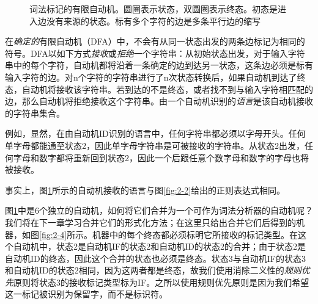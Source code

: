 \documentclass[cn,11pt,chinese]{elegantbook}
\begin{document}
\begin{figure}[htbp]
  \caption{词法标记的有限自动机。圆圈表示状态，双圆圈表示终态。初态是进入边没有来源的状态。标有多个字符的边是多条平行边的缩写}
  \label{fig:2-3}
\end{figure}

在\textit{确定的}有限自动机（DFA）中，不会有从同一状态出发的两条边标记为相同的符号。DFA以如下方式\textit{接收}或\textit{拒绝}一个字符串：从初始状态出发，对于输入字符串中的每个字符，自动机都将沿着一条确定的边到达另一状态，这条边必须是标有输入字符的边。对n个字符的字符串进行了n次状态转换后，如果自动机到达了终态，自动机将接收该字符串。若到达的不是终态，或者找不到与输入字符相匹配的边，那么自动机将拒绝接收这个字符串。由一个自动机识别的\textit{语言}是该自动机接收的字符串集合。

例如，显然，在由自动机ID识别的语言中，任何字符串都必须以字母开头。任何单字母都能通至状态2，因此单字母字符串是可被接收的字符串。从状态2出发，任何字母和数字都将重新回到状态2，因此一个后跟任意个数字母和数字的字母也将被接收。

事实上，图\ref{fig:2-3}所示的自动机接收的语言与图\ref{fig:2-2}给出的正则表达式相同。

图\ref{fig:2-3}中是6个独立的自动机，如何将它们合并为一个可作为词法分析器的自动机呢？我们将在下一章学习合并它们的形式化方法；在这里只给出合并它们后得到的机器，如图\ref{fig:2-4}所示。机器中的每个终态都必须标明它所接收的标记类型。在这个自动机中，状态2是自动机IF的状态2和自动机ID的状态2的合并；由于状态2是自动机ID的终态，因此这个合并的状态也必须是终态。状态3与自动机IF的状态3和自动机ID的状态2相同，因为这两者都是终态，故我们使用消除二义性的\textit{规则优先}原则将状态3的接收标记类型标为IF。之所以使用规则优先原则是因为我们希望这一标记被识别为保留字，而不是标识符。
\end{document}
